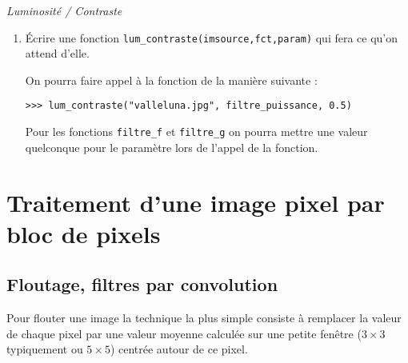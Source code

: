 \documentclass[10pt,a4paper,pdftex]{book}
\begin{document}
\begin{exoc}{\textit{Luminosité / Contraste}}
\begin{enumerate}
Sur le modèle ci-dessous
\begin{lstlisting}
def filtre_puissance(x,p):
    return int(255*(x/255)**p)
\end{lstlisting}
créer deux fonctions \verb!filtre_f(x,p)! et \verb!filtre_g(x,p)! qui font ce qu'on attend. La variable \texttt{p} n'interviendra pas dans la fonction, mais nous en avons besoin pour simplifier la suite.
\item Écrire une fonction \verb!lum_contraste(imsource,fct,param)! qui fera ce qu'on attend d'elle.

On pourra faire appel à la fonction de la manière suivante :
\begin{lstlisting}[style=compil]
>>> lum_contraste("valleluna.jpg", filtre_puissance, 0.5)
\end{lstlisting}
Pour les fonctions \verb!filtre_f! et \verb!filtre_g! on pourra mettre une valeur quelconque pour le paramètre lors de l'appel de la fonction.
\end{enumerate}
\end{exoc}

\section{Traitement d'une image pixel par bloc de pixels}

\subsection{Floutage, filtres par convolution}

Pour flouter une image la technique la plus simple consiste à remplacer la valeur de chaque pixel par une valeur moyenne calculée sur une petite fenêtre ($3 \times 3$ typiquement ou $5\times 5$) centrée autour de ce pixel.
\end{document}

